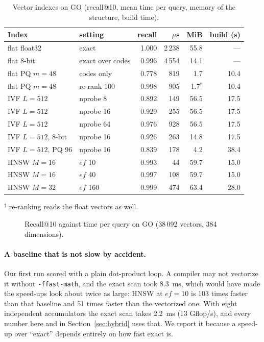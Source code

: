 \documentclass[sigconf, nonacm]{acmart}
\newcommand{\code}[1]{\texttt{#1}}
\begin{document}
\begin{table}[t]
\caption{Vector indexes on GO (recall@10, mean time per query, memory of the structure, build time).}
\label{tab:knn}
\small
\begin{tabular}{@{}llrrrr@{}}
\toprule
Index & setting & recall & $\mu$s & MiB & build (s) \\
\midrule
flat float32 & exact & 1.000 & 2\,238 & 55.8 & --- \\
flat 8-bit & exact over codes & 0.996 & 4\,554 & 14.1 & --- \\
flat PQ $m{=}48$ & codes only & 0.778 & 819 & 1.7 & 10.4 \\
flat PQ $m{=}48$ & re-rank 100 & 0.998 & 905 & 1.7$^\dagger$ & 10.4 \\
IVF $L{=}512$ & nprobe 8 & 0.892 & 149 & 56.5 & 17.5 \\
IVF $L{=}512$ & nprobe 16 & 0.929 & 255 & 56.5 & 17.5 \\
IVF $L{=}512$ & nprobe 64 & 0.976 & 928 & 56.5 & 17.5 \\
IVF $L{=}512$, 8-bit & nprobe 16 & 0.926 & 263 & 14.8 & 17.5 \\
IVF $L{=}512$, PQ 96 & nprobe 16 & 0.839 & 178 & 4.2 & 38.4 \\
HNSW $M{=}16$ & $ef$ 10 & 0.993 & 44 & 59.7 & 15.0 \\
HNSW $M{=}16$ & $ef$ 40 & 0.997 & 108 & 59.7 & 15.0 \\
HNSW $M{=}32$ & $ef$ 160 & 0.999 & 474 & 63.4 & 28.0 \\
\bottomrule
\end{tabular}

\smallskip
{\footnotesize $^\dagger$ re-ranking reads the float vectors as well.}
\end{table}

\begin{figure}[t]
\centering

\caption{Recall@10 against time per query on GO (38\,092 vectors, 384 dimensions).}
\label{fig:knn}
\end{figure}

\paragraph{A baseline that is not slow by accident.} Our first run scored with a plain dot-product loop. A compiler may not vectorize it without \code{-ffast-math}, and the exact scan took 8.3~ms, which would have made the speed-ups look about twice as large: HNSW at $ef{=}10$ is 103 times faster than that baseline and 51 times faster than the vectorized one. With eight independent accumulators the exact scan takes 2.2~ms (13 Gflop/s), and every number here and in Section~\ref{sec:hybrid} uses that. We report it because a speed-up over ``exact'' depends entirely on how fast exact is.
\end{document}
